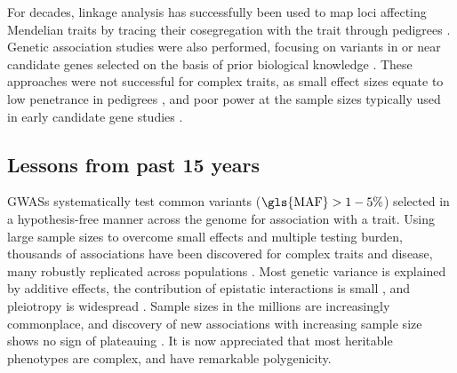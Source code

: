 \begin{outline}
\1 For decades, linkage analysis has successfully been used to map loci affecting Mendelian traits by tracing their cosegregation with the trait through pedigrees \autocite{visscher2012FiveYearsGWAS}.
Genetic association studies were also performed, focusing on variants in or near candidate genes selected on the basis of prior biological knowledge \autocite{hirschhorn2002ComprehensiveReviewGenetic}.
These approaches were not successful for complex traits, as small effect sizes equate to low penetrance in pedigrees \autocite{visscher2012FiveYearsGWAS},
and poor power at the sample sizes typically used in early candidate gene studies \autocite{border2019NoSupportHistorical}.

\subsection{Lessons from past 15 years}

\1 \Glspl{GWAS} systematically test common variants ($\text{\gls{MAF}} > 1-5\%$) selected in a hypothesis-free manner across the genome for association with a trait.
Using large sample sizes to overcome small effects and multiple testing burden, thousands of associations have been discovered for complex traits and disease,
many robustly replicated across populations \autocite{visscher2012FiveYearsGWAS,visscher201710YearsGWAS}.
Most genetic variance is explained by additive effects, the contribution of epistatic interactions is small \autocite{visscher2019Fisher1918Paper}, 
and pleiotropy is widespread \autocite{visscher2012FiveYearsGWAS}.
Sample sizes in the millions are increasingly commonplace, 
and discovery of new associations with increasing sample size shows no sign of plateauing \autocite{tam2019BenefitsLimitationsGenomewide}.
It is now appreciated that most heritable phenotypes are complex, and have remarkable polygenicity.



\end{outline}
